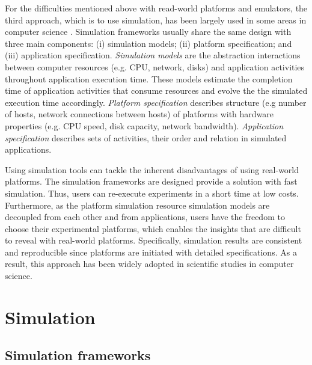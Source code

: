 For the difficulties mentioned above with read-world platforms 
and emulators, the third approach, which is to use simulation, has been  
largely used in some areas in computer science \cite{casanova2008simgrid}.  
Simulation frameworks usually share the same design with three main 
components: (i) simulation models; (ii) platform specification; 
and (iii) application specification.
\textit{Simulation models} are the abstraction interactions between computer 
resources (e.g. CPU, network, disks) and application activities throughout 
application execution time. 
These models estimate the completion time of application activities 
that consume resources and evolve the the simulated execution time accordingly.
\textit{Platform specification} describes structure (e.g number of hosts, network
connections between hosts) of platforms with hardware properties 
(e.g. CPU speed, disk capacity, network bandwidth).
\textit{Application specification} describes sets of activities, their order 
and relation in simulated applications.

Using simulation tools can tackle the inherent disadvantages of using 
real-world platforms. 
The simulation frameworks are designed  provide 
a solution with fast simulation. 
Thus, users can re-execute experiments in a short time at low costs.
Furthermore, as the platform simulation resource simulation models 
are decoupled from each other and from applications, users have 
the freedom to choose their experimental platforms, which enables the 
insights that are difficult to reveal with real-world platforms. 
Specifically, simulation results are consistent and reproducible since 
platforms are initiated with detailed specifications. 
As a result, this approach has been widely adopted in scientific studies
in computer science. 

\section{Simulation}

\subsection{Simulation frameworks}

